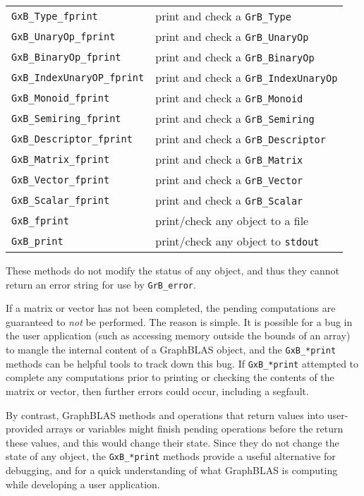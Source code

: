 \documentclass[12pt]{article}
\begin{document}
\vspace{0.2in}
{\footnotesize
\begin{tabular}{ll}
\hline
\verb'GxB_Type_fprint'         & print and check a \verb'GrB_Type' \\
\verb'GxB_UnaryOp_fprint'      & print and check a \verb'GrB_UnaryOp' \\
\verb'GxB_BinaryOp_fprint'     & print and check a \verb'GrB_BinaryOp' \\
\verb'GxB_IndexUnaryOP_fprint' & print and check a \verb'GrB_IndexUnaryOp' \\
\verb'GxB_Monoid_fprint'       & print and check a \verb'GrB_Monoid' \\
\verb'GxB_Semiring_fprint'     & print and check a \verb'GrB_Semiring' \\
\verb'GxB_Descriptor_fprint'   & print and check a \verb'GrB_Descriptor' \\
\verb'GxB_Matrix_fprint'       & print and check a \verb'GrB_Matrix' \\
\verb'GxB_Vector_fprint'       & print and check a \verb'GrB_Vector' \\
\verb'GxB_Scalar_fprint'       & print and check a \verb'GrB_Scalar' \\
\hline
\verb'GxB_fprint'             & print/check any object to a file \\
\verb'GxB_print'              & print/check any object to \verb'stdout' \\
\hline
\end{tabular}
}
\vspace{0.2in}

These methods do not modify the status of any object, and thus they
cannot return an error string for use by \verb'GrB_error'.

If a matrix or vector
has not been completed, the pending computations are guaranteed to {\em not} be
performed. The reason is simple.  It is possible for a bug in the user
application (such as accessing memory outside the bounds of an array) to mangle
the internal content of a GraphBLAS object, and the \verb'GxB_*print' methods
can be helpful tools to track down this bug.  If \verb'GxB_*print' attempted to
complete any computations prior to printing or checking the contents of the
matrix or vector, then further errors could occur, including a segfault.

By contrast, GraphBLAS methods and operations that return values into
user-provided arrays or variables might finish pending operations before the
return these values, and this would change their state.  Since they do not
change the state of any object, the \verb'GxB_*print' methods provide a useful
alternative for debugging, and for a quick understanding of what GraphBLAS is
computing while developing a user application.
\end{document}
